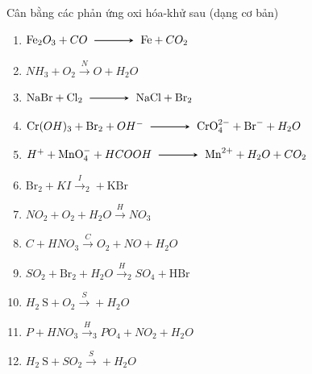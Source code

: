 	\begin{bt}
		Cân bằng các phản ứng oxi hóa-khử sau (dạng cơ bản)
		\begin{enumerate}[(1)]
			\item $\mathrm{Fe}_2O_3+CO \xrightarrow \mathrm{Fe}+CO_2$
			\item $NH_3+O_2\xrightarrow NO+H_2O$
			\item $\mathrm{NaBr}+\mathrm{Cl}_2\xrightarrow \mathrm{NaCl}+\mathrm{Br}_2$
			\item $\mathrm{Cr}(OH)_3+\mathrm{Br}_2+OH^{-} \xrightarrow \mathrm{CrO}_4^{2-}+\mathrm{Br}^{-}+H_2O$
			\item $H^{+}+\mathrm{MnO}_4^{-}+HCOOH \xrightarrow \mathrm{Mn}^{2+}+H_2O+CO_2$
			\item $\mathrm{Br}_2+KI \xrightarrow I_2+\mathrm{KBr}$
			\item $NO_2+O_2+H_2O\xrightarrow HNO_3$
			\item $C+HNO_3\xrightarrow CO_2+NO+H_2O$
			\item $SO_2+\mathrm{Br}_2+H_2O\xrightarrow H_2SO_4+\mathrm{HBr}$
			\item $H_2\mathrm{~S}+O_2\xrightarrow S+H_2O$
			\item $P+HNO_3\xrightarrow H_3PO_4+NO_2+H_2O$
			\item $H_2\mathrm{~S}+SO_2\xrightarrow S+H_2O$
		\end{enumerate}
	\end{bt}
